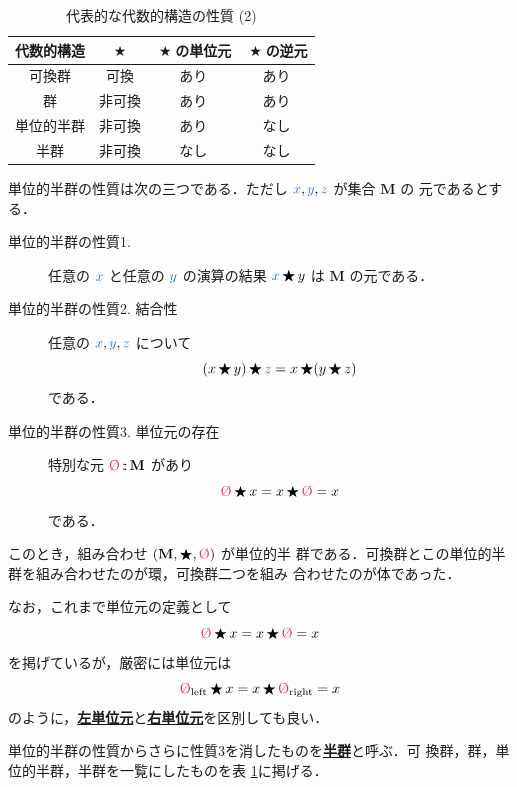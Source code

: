 \documentclass[a5paper,twoside,fleqn,draft]{jsbook}
\def\constantColor{WildStrawberry}
\def\varColor{NavyBlue}
\newcommand{\keyword}[1]{{\underline{\textbf{#1}}}}
\newcommand{\mSpecialConstant}[1]{\textcolor{\constantColor}{\textrm{#1}}}
\newcommand{\mZero}{\mSpecialConstant{\O}}
\newcommand{\mVar}[1]{\textcolor{\varColor}{#1}}
\newcommand{\mXVar}{\mVar{x}}
\newcommand{\mYVar}{\mVar{y}}
\newcommand{\mZVar}{\mVar{z}}
\DeclareMathOperator{\mBinOp}{\bigstar}
\DeclareMathOperator{\mIn}{{:\!:}}
\newcommand{\mSpecialSub}[1]{\text{#1}}
\newcommand{\mLeft}{\mSpecialSub{left}}
\newcommand{\mRight}{\mSpecialSub{right}}
\newcommand{\mSet}[1]{\mathbf{#1}}
\newcommand{\mTupleWith}[1]{\left(#1\right)}
\begin{document}
\begin{table}
\caption{代表的な代数的構造の性質 (2)}
\label{tab:group-and-monoid}
\begin{center}
\begin{tabular}{||c||c|c|c||}
\hline
代数的構造&$\mBinOp$&$\mBinOp$の単位元&$\mBinOp$の逆元\\
\hline\hline
可換群&可換&あり&あり\\
群&非可換&あり&あり\\
単位的半群&非可換&あり&なし\\
半群&非可換&なし&なし\\
\hline
\end{tabular}
\end{center}
\end{table}

単位的半群の性質は次の三つである．ただし $\mXVar,\mYVar,\mZVar$ が集合 $\mSet{M}$ の
元であるとする．
\begin{description}
\item[単位的半群の性質1.] 任意の $\mXVar$ と任意の $\mYVar$ の演算の結果
$\mXVar\mBinOp y$ は $\mSet{M}$ の元である．
\item[単位的半群の性質2. 結合性] 任意の $\mXVar,\mYVar,\mZVar$ について
\begin{equation}
(x\mBinOp y)\mBinOp \mZVar=x\mBinOp(y\mBinOp z)
\end{equation}
である．
\item[単位的半群の性質3. 単位元の存在] 特別な元 $\mZero\mIn\mSet{M}$ があり
\begin{equation}
\mZero\mBinOp x=x\mBinOp\mZero=x
\end{equation}
である．
\end{description}
このとき，組み合わせ $\mTupleWith{\mSet{M},\mBinOp,\mZero}$ が単位的半
群である．可換群とこの単位的半群を組み合わせたのが環，可換群二つを組み
合わせたのが体であった．

なお，これまで単位元の定義として
\begin{equation}
\mZero\mBinOp x=x\mBinOp\mZero=x
\end{equation}
を掲げているが，厳密には単位元は
\begin{equation}
\mZero_\mLeft\mBinOp x=x\mBinOp\mZero_\mRight=x
\end{equation}
のように，\keyword{左単位元}と\keyword{右単位元}を区別しても良い．

単位的半群の性質からさらに性質3を消したものを\keyword{半群}と呼ぶ．可
換群，群，単位的半群，半群を一覧にしたものを表
\ref{tab:group-and-monoid}に掲げる．
\end{document}
